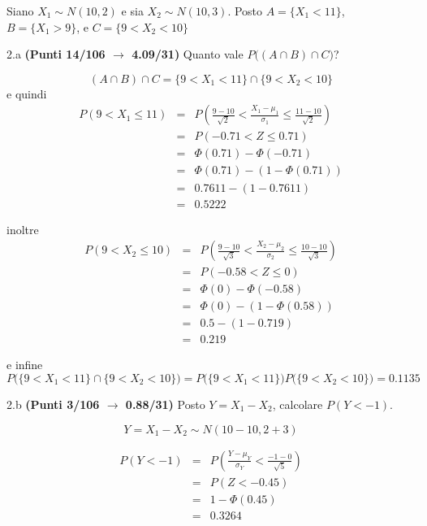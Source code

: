 \documentclass[
  11pt,
]{book}
\theoremstyle{mytheoremstyle}
\theoremstyle{mydefstyle}
\newenvironment{sol}
  {
  \begin{tcolorbox}[enhanced,breakable,arc=0.1mm,boxrule=1pt,colback=white,colframe=iblue,
  title=\bf \fontfamily{lmss}\selectfont \hspace{.5 cm} Soluzione,drop fuzzy shadow]

}{
\end{tcolorbox}
  }
\begin{document}
Siano \(X_1\sim N(10,2)\) e sia \(X_2\sim N(10,3)\). Posto \(A=\{X_1<11\}\), \(B=\{X_1>9\}\), e \(C=\{9<X_2<10\}\)

2.a \textbf{(Punti 14/106 \(\rightarrow\) 4.09/31)} Quanto vale \(P\Big((A\cap B)\cap C\Big)\)?

\begin{sol}
\[
(A\cap B)\cap C = \{9<X_1<11\}\cap\{9<X_2<10\}
\]
e quindi
\begin{eqnarray*}
   P( 9 < X_1 \leq  11 ) &=& P\left( \frac { 9  -  10 }{\sqrt{ 2 }} < \frac { X_1  -  \mu_1 }{ \sigma_1 } \leq \frac { 11  -  10 }{\sqrt{ 2 }}\right)  \\
              &=& P\left(  -0.71  < Z \leq  0.71 \right) \\
              &=& \Phi( 0.71 )-\Phi( -0.71 )\\
              &=&  \Phi( 0.71 )-(1-\Phi( 0.71 )) \\ &=&  0.7611 -(1- 0.7611 ) \\ 
              &=&  0.5222 
   \end{eqnarray*}

inoltre
\begin{eqnarray*}
   P( 9 < X_2 \leq  10 ) &=& P\left( \frac { 9  -  10 }{\sqrt{ 3 }} < \frac { X_2  -  \mu_2 }{ \sigma_2 } \leq \frac { 10  -  10 }{\sqrt{ 3 }}\right)  \\
              &=& P\left(  -0.58  < Z \leq  0 \right) \\
              &=& \Phi( 0 )-\Phi( -0.58 )\\
              &=&  \Phi( 0 )-(1-\Phi( 0.58 )) \\ &=&  0.5 -(1- 0.719 ) \\ 
              &=&  0.219 
   \end{eqnarray*}

e infine
\[
P\Big(\{9<X_1<11\}\cap\{9<X_2<10\}\Big)=P\Big(\{9<X_1<11\}\Big)P\Big(\{9<X_2<10\}\Big)=
0.1135
\]

\end{sol}

2.b \textbf{(Punti 3/106 \(\rightarrow\) 0.88/31)} Posto \(Y=X_1-X_2\), calcolare \(P(Y<-1)\).

\begin{sol}
\[Y=X_1-X_2\sim N(10-10,2+3)\]

\begin{eqnarray*}
      P( Y   <   -1 ) 
        &=& P\left(  \frac { Y  -  \mu_Y }{ \sigma_Y }  <  \frac { -1  -  0 }{\sqrt{ 5 }} \right)  \\
                 &=& P\left(  Z   <   -0.45 \right) \\    
                 &=&  1-\Phi( 0.45 ) \\ &=&  0.3264 
      \end{eqnarray*}

\end{sol}
\end{document}
